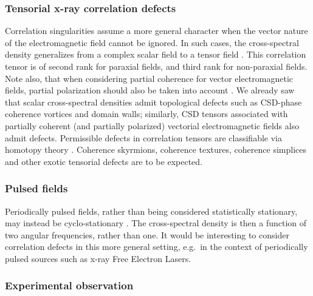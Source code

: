 \documentclass[%
 reprint,
 amsmath,amssymb,
 aps,
]{revtex4-1}
\begin{document}
\subsubsection{Tensorial x-ray correlation defects} 

Correlation singularities assume a more general character when the vector nature of the electromagnetic field cannot be ignored.  In such cases, the cross-spectral density generalizes from a complex scalar field to a tensor field \cite{mandel_wolf,wolf_thin_book}.  This correlation tensor is of second rank for paraxial fields, and third rank for non-paraxial fields.  Note also, that when considering partial coherence for vector electromagnetic fields, partial polarization should also be taken into account \cite{wolf_thin_book}.  We already saw that scalar cross-spectral densities admit topological defects such as CSD-phase coherence vortices and domain walls; similarly, CSD tensors associated with partially coherent (and partially polarized) vectorial electromagnetic fields also admit defects.  Permissible defects in correlation tensors are classifiable via homotopy theory \cite{VilenkinShellard1994,Volovik2003}.  Coherence skyrmions, coherence textures, coherence simplices \cite{SimulaPaganin2012} and other exotic tensorial defects are to be expected.

\subsubsection{Pulsed fields}

Periodically pulsed fields, rather than being considered statistically stationary, may instead be cyclo-stationary \cite{Gardner,Schoonover2009}.  The cross-spectral density is then a function of two angular frequencies, rather than one.  It would be interesting to consider correlation defects in this more general setting, e.g.~in the context of periodically pulsed sources such as x-ray Free Electron Lasers.  

\subsubsection{Experimental observation} 
\end{document}
